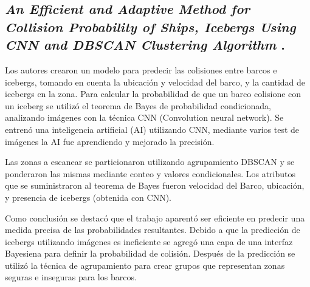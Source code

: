 \subsection{
    \textbf{\emph{An Efficient and Adaptive Method for Collision
            Probability of Ships, Icebergs Using CNN
            and DBSCAN Clustering Algorithm}
    }
    \cite[pág. 20]{somani_emerging_2019}.
}

Los autores crearon un modelo para predecir las colisiones entre barcos e icebergs,
tomando en cuenta la ubicación y velocidad del barco, y la cantidad de icebergs en la zona.
Para calcular la probabilidad de que un barco colisione con un iceberg
se utilizó el teorema de Bayes de probabilidad condicionada, analizando imágenes con la técnica CNN (Convolution neural network).
Se entrenó una inteligencia artificial (AI) utilizando CNN, mediante varios test de imágenes la AI fue aprendiendo
y mejorado la precisión.\par

Las zonas a escanear se particionaron utilizando agrupamiento DBSCAN  y se ponderaron
las mismas mediante conteo y valores condicionales. Los atributos que se suministraron al teorema de Bayes fueron
velocidad del Barco, ubicación, y presencia de icebergs (obtenida con CNN).\par

Como conclusión se destacó que el trabajo aparentó ser eficiente en predecir
una medida precisa de  las probabilidades resultantes.
Debido a que la predicción de icebergs utilizando imágenes es ineficiente se agregó una capa de una interfaz Bayesiena
para definir la probabilidad de colisión. Después de la predicción se utilizó
la técnica de agrupamiento para crear grupos que representan zonas seguras e inseguras para los barcos.\par